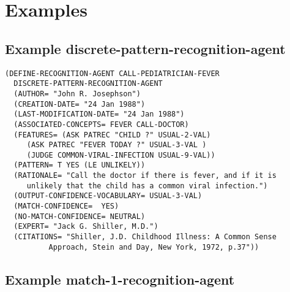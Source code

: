 \section{Examples}

\subsection{Example discrete-pattern-recognition-agent}

\begin{verbatim}
(DEFINE-RECOGNITION-AGENT CALL-PEDIATRICIAN-FEVER
  DISCRETE-PATTERN-RECOGNITION-AGENT
  (AUTHOR= "John R. Josephson")
  (CREATION-DATE= "24 Jan 1988")
  (LAST-MODIFICATION-DATE= "24 Jan 1988")
  (ASSOCIATED-CONCEPTS= FEVER CALL-DOCTOR)
  (FEATURES= (ASK PATREC "CHILD ?" USUAL-2-VAL)
	 (ASK PATREC "FEVER TODAY ?" USUAL-3-VAL )
	 (JUDGE COMMON-VIRAL-INFECTION USUAL-9-VAL))
  (PATTERN= T YES (LE UNLIKELY))
  (RATIONALE= "Call the doctor if there is fever, and if it is
	 unlikely that the child has a common viral infection.")
  (OUTPUT-CONFIDENCE-VOCABULARY= USUAL-3-VAL)
  (MATCH-CONFIDENCE=  YES)
  (NO-MATCH-CONFIDENCE= NEUTRAL)
  (EXPERT= "Jack G. Shiller, M.D.")
  (CITATIONS= "Shiller, J.D. Childhood Illness: A Common Sense
	      Approach, Stein and Day, New York, 1972, p.37"))
\end{verbatim}

\subsection{Example match-1-recognition-agent}

